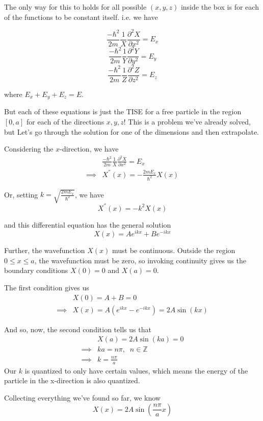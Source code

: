 \documentclass[twoside]{article}
\begin{document}
\begin{enumerate}[label=\alph*]
   The only way for this to holds for all possible $(x,y,z)$ inside the box is for each of the functions to be constant itself. i.e. we have 

   \[ \frac{-\hbar^2}{2m}\frac{1}{X}\frac{\partial^2 X}{\partial x^2} = E_x \]
   \[ \frac{-\hbar^2}{2m}\frac{1}{Y}\frac{\partial^2 Y}{\partial y^2} = E_y \]
   \[ \frac{-\hbar^2}{2m}\frac{1}{Z}\frac{\partial^2 Z}{\partial z^2} = E_z \]

   where $E_x + E_y + E_z = E$. 
   
   
   But each of these equations is just the TISE for a free particle in the region $[0, a]$ for each of the directions $x, y, z$! This is a problem we've already solved, but Let's go through the solution for one of the dimensions and then extrapolate.
   \vskip 0.5cm

   Considering the $x$-direction, we have 
   \begin{align*}
      &\frac{-\hbar^2}{2m}\frac{1}{X}\frac{\partial^2 X}{\partial x^2} = E_x \\
      \implies& X^{''}(x) = -\frac{2mE_x}{\hbar^2} X(x)
   \end{align*}

   Or, setting $k = \sqrt{\frac{2mE_x}{\hbar^2}}$, we have
   \[ X^{''}(x) = -k^2 X(x) \]

   and this differential equation has the general solution
   \[ \boxed{ X(x) = Ae^{ikx} + Be^{-ikx}} \]

   Further, the wavefunction $X(x)$ must be continuous. Outside the region $0 \leq x \leq a$, the wavefunction must be zero, so invoking continuity gives us the boundary conditions $X(0) = 0$ and $X(a) = 0$.

   The first condition gives us 
   \begin{align*}
      &X(0) = A + B = 0 \\
      \implies& X(x) = A(e^{ikx} - e^{-ikx}) = 2A\sin(kx)
   \end{align*}

   And so, now, the second condition tells us that 
   \begin{align*}
      &X(a) = 2A \sin(ka) = 0\\
      \implies& ka = n\pi,\;\; n \in \mathbb{Z} \\
      \implies& k = \frac{n\pi}{a}
   \end{align*}
   Our $k$ is quantized to only have certain values, which means the energy of the particle in the x-direction is also quantized.


   Collecting everything we've found so far, we know
   \[ X(x) = 2A\sin\left(\frac{n\pi}{a}x\right) \]


\end{enumerate}
\end{document}
